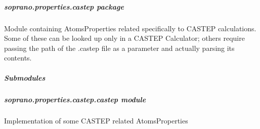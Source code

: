 \documentclass[letterpaper,10pt,english]{sphinxmanual}
\begin{document}
\subparagraph{soprano.properties.castep package}
\label{doctree/soprano.properties.castep:module-soprano.properties.castep}\label{doctree/soprano.properties.castep::doc}\label{doctree/soprano.properties.castep:soprano-properties-castep-package}
Module containing AtomsProperties related specifically to CASTEP calculations.
Some of these can be looked up only in a CASTEP Calculator; others require
passing the path of the .castep file as a parameter and actually parsing its
contents.


\subparagraph{Submodules}
\label{doctree/soprano.properties.castep:submodules}

\subparagraph{soprano.properties.castep.castep module}
\label{doctree/soprano.properties.castep.castep:soprano-properties-castep-castep-module}\label{doctree/soprano.properties.castep.castep::doc}\label{doctree/soprano.properties.castep.castep:module-soprano.properties.castep.castep}
Implementation of some CASTEP related AtomsProperties
\end{document}
